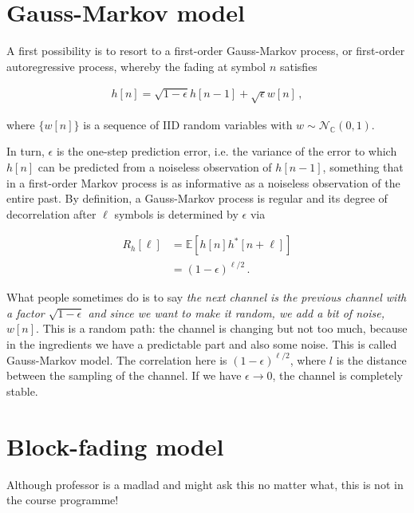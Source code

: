 \documentclass[a4paper, 12pt]{book}
\begin{document}
\section{Gauss-Markov model}

A first possibility is to resort to a first-order Gauss-Markov process, or first-order autoregressive process, whereby the fading at symbol $n$ satisfies

\begin{align}
h[n] = \sqrt{1 - \epsilon} h[n-1] + \sqrt{\epsilon} w[n] \,, \tag{3.61}
\end{align}

where $\{w[n]\}$ is a sequence of IID random variables with $w \sim \mathcal{N}_{\mathbb{C}}(0,1)$.

In turn, $\epsilon$ is the one-step prediction error, i.e. the variance of the error to which $h[n]$ can be predicted from a noiseless observation of $h[n-1]$, something that in a first-order Markov process is as informative as a noiseless observation of the entire past. By definition, a Gauss-Markov process is regular and its degree of decorrelation after $\ell$ symbols is determined by $\epsilon$ via

\begin{align}
R_h[\ell] &= \mathbb{E}[h[n]h^*[n+\ell]] \tag{3.62} \\
&= (1 - \epsilon)^{\ell/2} \,. \tag{3.63}
\end{align}

What people sometimes do is to say \textit{the next channel is the previous channel with a factor $\sqrt{1-\epsilon}$ and since we want to make it random, we add a bit of noise, $w[n]$}.
This is a random path: the channel is changing but not too much, because in the ingredients we have a predictable part and also some noise.
This is called Gauss-Markov model. The correlation here is $(1-\epsilon)^{\ell/2}$, where $l$ is the distance between the sampling of the channel.
If we have $\epsilon \to 0$, the channel is completely stable.

\section{Block-fading model}


\begin{tcolorbox}[colback=white, colframe=red!80!white, title=\textbf{\faBomb \, Might not be in the exam}, fonttitle=\bfseries\color{red!80!white}, coltitle=red!80!white, attach boxed title to top left={yshift=-2mm, xshift=2mm}, boxed title style={colback=white, frame hidden}, sharp corners]
Although professor is a madlad and might ask this no matter what, this is not in the course programme!
\end{tcolorbox}
\end{document}
